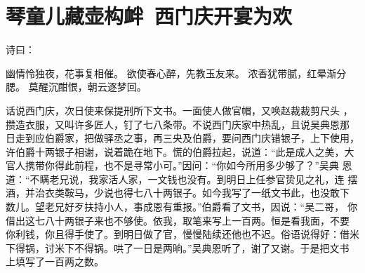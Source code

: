 \chapter{琴童儿藏壶构衅~西门庆开宴为欢}

诗曰：

幽情怜独夜，花事复相催。
欲使春心醉，先教玉友来。
浓香犹带腻，红晕渐分腮。
莫醒沉酣恨，朝云逐梦回。

话说西门庆，次日使来保提刑所下文书。一面使人做官帽，又唤赵裁裁剪尺头
，攒造衣服，又叫许多匠人，钉了七八条带。不说西门庆家中热乱，且说吴典恩那
日走到应伯爵家，把做驿丞之事，再三央及伯爵，要问西门庆错银子，上下使用，
许伯爵十两银子相谢，说着跪在地下。慌的伯爵拉起，说道：“此是成人之美，大
官人携带你得此前程，也不是寻常小可。”因问：“你如今所用多少够了？”吴典
恩道：“不瞒老兄说，我家活人家，一文钱也没有。到明日上任参官贽见之礼，连
摆酒，并治衣类鞍马，少说也得七八十两银子。如今我写了一纸文书此，也没敢下
数儿。望老兄好歹扶持小人，事成恩有重报。”伯爵看了文书，因说：“吴二哥，
你借出这七八十两银子来也不够使。依我，取笔来写上一百两。恒是看我面，不要
你利钱，你且得手使了。到明日做了官，慢慢陆续还他也不迟。俗语说得好：借米
下得锅，讨米下不得锅。哄了一日是两晌。”吴典恩听了，谢了又谢。于是把文书
上填写了一百两之数。

